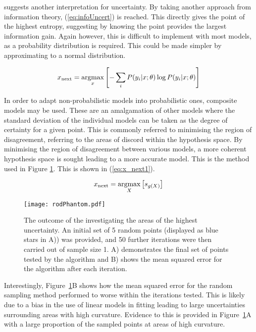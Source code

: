 \textcite{Set09} suggests another interpretation for uncertainty. By taking another approach from information theory, (\ref{eq:infoUncert}) is reached. This directly gives the point of the highest entropy, suggesting by knowing the point provides the largest information gain. Again however, this is difficult to implement with most models, as a probability distribution is required. This could be made simpler by approximating to a normal distribution.

\begin{equation}
    \label{eq:infoUncert}
    x_\mathrm{next}=\operatorname*{argmax}_x{\left[-\sum_i{P(y_i|x;\theta)\log{P(y_i|x;\theta)}}\right]}
\end{equation}


In order to adapt non-probabilistic models into probabilistic ones, composite models may be used. These are an amalgamation of other models where the standard deviation of the individual models can be taken as the degree of certainty for a given point. This is commonly referred to minimising the region of disagreement, referring to the areas of discord within the hypothesis space. By minimising the region of disagreement between various models, a more coherent hypothesis space is sought leading to a more accurate model. This is the method used in Figure \ref{fig:rodPhantom}. This is shown in (\ref{eq:x_next1}).

\begin{equation}
    \label{eq:x_next1}
    x_\mathrm{next}=\operatorname*{argmax}_X{\left[s_{g(X)}\right]}
\end{equation}

\begin{figure}[H]
    \begin{center}
        \texttt{[image: rodPhantom.pdf]}
        \caption[Uncertainty Sampling Demonstration]{The outcome of the investigating the areas of the highest uncertainty. An initial set of 5 random points (displayed as blue stars in A)) was provided, and 50 further iterations were then carried out of sample size 1. A) demonstrates the final set of points tested by the algorithm and B) shows the mean squared error for the algorithm after each iteration.}
        \label{fig:rodPhantom}
    \end{center}
\end{figure}

Interestingly, Figure~\ref{fig:rodPhantom}B shows how the mean squared error for the random sampling method performed to worse within the iterations tested. This is likely due to a bias in the use of linear models in fitting leading to large uncertainties surrounding areas with high curvature. Evidence to this is provided in Figure~\ref{fig:rodPhantom}A with a large proportion of the sampled points at areas of high curvature.


